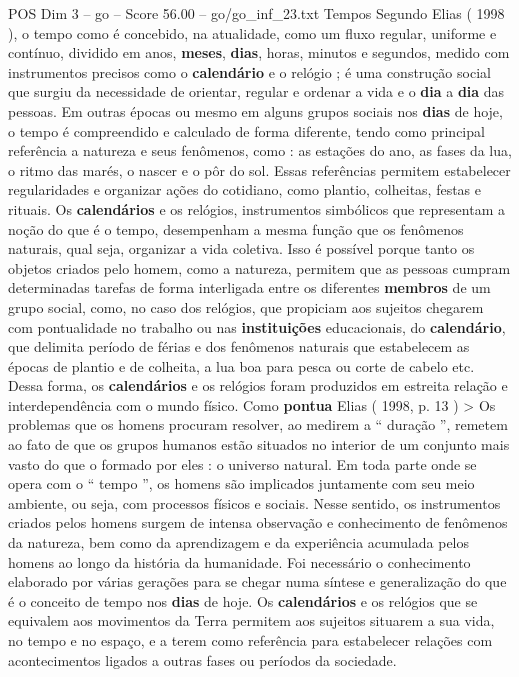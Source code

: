 \begin{textsample}{POS Dim 3 – go – Score 56.00 – go/go\_inf\_23.txt}
Tempos Segundo Elias ( 1998 ), o tempo como é concebido, na atualidade, como um fluxo regular, uniforme e contínuo, dividido em anos, \textbf{meses}, \textbf{dias}, horas, minutos e segundos, medido com instrumentos precisos como o \textbf{calendário} e o relógio ; é uma construção social que surgiu da necessidade de orientar, regular e ordenar a vida e o \textbf{dia} a \textbf{dia} das pessoas.
Em outras épocas ou mesmo em alguns grupos sociais nos \textbf{dias} de hoje, o tempo é compreendido e calculado de forma diferente, tendo como principal referência a natureza e seus fenômenos, como : as estações do ano, as fases da lua, o ritmo das marés, o nascer e o pôr do sol.
Essas referências permitem estabelecer regularidades e organizar ações do cotidiano, como plantio, colheitas, festas e rituais.
Os \textbf{calendários} e os relógios, instrumentos simbólicos que representam a noção do que é o tempo, desempenham a mesma função que os fenômenos naturais, qual seja, organizar a vida coletiva.
Isso é possível porque tanto os objetos criados pelo homem, como a natureza, permitem que as pessoas cumpram determinadas tarefas de forma interligada entre os diferentes \textbf{membros} de um grupo social, como, no caso dos relógios, que propiciam aos sujeitos chegarem com pontualidade no trabalho ou nas \textbf{instituições} educacionais, do \textbf{calendário}, que delimita período de férias e dos fenômenos naturais que estabelecem as épocas de plantio e de colheita, a lua boa para pesca ou corte de cabelo etc.
Dessa forma, os \textbf{calendários} e os relógios foram produzidos em estreita relação e interdependência com o mundo físico.
Como \textbf{pontua} Elias ( 1998, p. 13 ) > Os problemas que os homens procuram resolver, ao medirem a “ duração ”, remetem ao fato de que os grupos humanos estão situados no interior de um conjunto mais vasto do que o formado por eles : o universo natural.
Em toda parte onde se opera com o “ tempo ”, os homens são implicados juntamente com seu meio ambiente, ou seja, com processos físicos e sociais.
Nesse sentido, os instrumentos criados pelos homens surgem de intensa observação e conhecimento de fenômenos da natureza, bem como da aprendizagem e da experiência acumulada pelos homens ao longo da história da humanidade.
Foi necessário o conhecimento elaborado por várias gerações para se chegar numa síntese e generalização do que é o conceito de tempo nos \textbf{dias} de hoje.
Os \textbf{calendários} e os relógios que se equivalem aos movimentos da Terra permitem aos sujeitos situarem a sua vida, no tempo e no espaço, e a terem como referência para estabelecer relações com acontecimentos ligados a outras fases ou períodos da sociedade.

\end{textsample}
